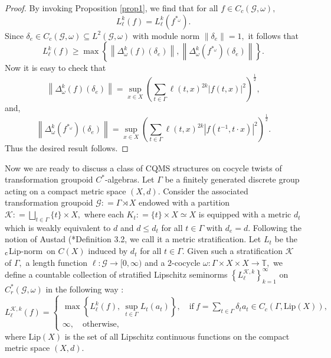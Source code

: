 \documentclass[a4paper,11pt,reqno]{amsart}
\theoremstyle{plain}
\theoremstyle{mainthmstyle}
\theoremstyle{named}
\numberwithin{equation}{section}
\newcommand{\clipnorm}{$_{\text{\rm c}}$Lip-norm}
\begin{document}
\begin{proof}
By invoking Proposition \ref{prop1}, we find that for all $f \in C_c (\mathcal G, \omega),$ $$L_{\ell}^{k} (f) = L_{\ell}^{k} \left (f^{\ast_{\omega}} \right ).$$ Since $\delta_e \in C_c (\mathcal G, \omega) \subseteq L^2 (\mathcal G, \omega)$ with module norm $\|\delta_e\| = 1,$ it follows that $$L_{\ell}^{k} (f) \geq \max \left \{\left \|\Delta_{\omega}^{k} (f) (\delta_e) \right \|, \left \|\Delta_{\omega}^{k} \left (f^{\ast_{\omega}} \right ) (\delta_e) \right \| \right \}.$$
Now it is easy to check that $$\left \|\Delta_{\omega}^{k} (f) (\delta_e) \right \| = \sup\limits_{x \in X} \left (\sum\limits_{t \in \Gamma} \ell (t, x)^{2 k} \left \lvert f (t, x) \right \rvert^{2} \right )^{\frac {1} {2}},$$ and, $$\left \|\Delta_{\omega}^{k} \left (f^{\ast_{\omega}} \right ) (\delta_e) \right \| = \sup\limits_{x \in X} \left (\sum\limits_{t \in \Gamma} \ell (t, x)^{2 k} \left \lvert f \left (t^{-1}, t \cdot x \right ) \right \rvert^{2} \right )^{\frac {1} {2}}.$$
Thus the desired result follows.

\end{proof}   
Now we are ready to discuss a class of CQMS structures on cocycle twists of transformation groupoid $C^{\ast}$-algebras. Let $\Gamma$ be a finitely generated discrete group acting on a compact metric space $(X, d).$ Consider the associated transformation groupoid $\mathcal G : = \Gamma \rtimes X$ endowed with a partition $\mathcal K : = \bigsqcup\limits_{t \in \Gamma} \{t\} \times X,$ where each $K_t : = \{t\} \times X \simeq X$ is equipped with a metric $d_t$ which is weakly equivalent to $d$ and $d \leq d_t$ for all $t \in \Gamma$ with $d_e = d.$ Following the notion of Austad (\cite{austad2026quantum}*{Definition 3.2}, we call it a metric stratification. Let $L_t$ be the \clipnorm\ on $C (X)$ induced by $d_t$ for all $t \in \Gamma.$ Given such a stratification $\mathcal K$ of $\Gamma,$ a length function $\ell : \mathcal G \rightarrow [0, \infty)$ and a $2$-cocycle $\omega : \Gamma \times X \times X \rightarrow \mathbb T,$ we define a countable collection of stratified Lipschitz seminorms $\left \{L^{\mathcal K, k}_{\ell} \right \}_{k = 1}^{\infty}$ on $C_r^{\ast} (\mathcal G, \omega)$ in the following way $:$
$$L^{\mathcal K, k}_{\ell} (f) = \begin{cases} \max \left \{L_{\ell}^{k} (f),\ \sup\limits_{t \in \Gamma} L_t (a_t) \right \}, \quad \mathrm {if}\ f = \sum\limits_{t \in \Gamma} \delta_t a_t \in C_c \left (\Gamma, \mathrm {Lip} (X) \right), \\ \infty, \quad \mathrm {otherwise}, \end{cases}$$
where $\mathrm {Lip} (X)$ is the set of all Lipschitz continuous functions on the compact metric space $(X, d).$
\end{document}
